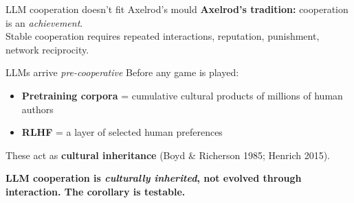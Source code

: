 \documentclass[11pt,aspectratio=169]{beamer}
\newcommand{\takeaway}[1]{%
  \begin{center}
    \colorbox{rsnavy!10}{%
      \begin{minipage}{0.92\textwidth}
        \centering\textbf{#1}
      \end{minipage}}
  \end{center}}
\begin{document}
\begin{frame}{LLM cooperation doesn't fit Axelrod's mould}
    \large
    \textbf{Axelrod's tradition:} cooperation is an \emph{achievement}.\\
    Stable cooperation requires repeated interactions, reputation, punishment, network reciprocity.
    \vspace{0.3cm}
    \begin{block}{LLMs arrive \emph{pre-cooperative}}
        Before any game is played:
        \begin{itemize}
            \setlength\itemsep{0.2em}
            \item \textbf{Pretraining corpora} = cumulative cultural products of millions of human authors
            \item \textbf{RLHF} = a layer of selected human preferences
        \end{itemize}
        \vspace{0.2cm}
        These act as \textbf{cultural inheritance} (Boyd \& Richerson 1985; Henrich 2015).
    \end{block}
    \vspace{0.3cm}
    \takeaway{LLM cooperation is \emph{culturally inherited}, not evolved through interaction. The corollary is testable.}
\end{frame}
\end{document}
